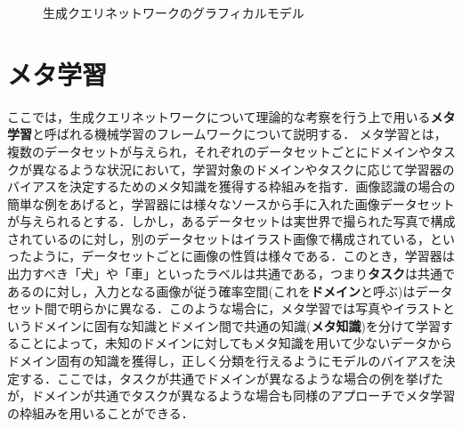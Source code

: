 \begin{figure}[tbp]
\begin{center}
\caption{生成クエリネットワークのグラフィカルモデル}
\label{fig:gm_gqn}
\end{center}
\end{figure}

\section{メタ学習}
\label{section:meta_learning}
ここでは，生成クエリネットワークについて理論的な考察を行う上で用いる{\bf メタ学習}と呼ばれる機械学習のフレームワークについて説明する．
メタ学習とは，複数のデータセットが与えられ，それぞれのデータセットごとにドメインやタスクが異なるような状況において，学習対象のドメインやタスクに応じて学習器のバイアスを決定するためのメタ知識を獲得する枠組みを指す\cite{Vilalta2002}．画像認識の場合の簡単な例をあげると，学習器には様々なソースから手に入れた画像データセットが与えられるとする．しかし，あるデータセットは実世界で撮られた写真で構成されているのに対し，別のデータセットはイラスト画像で構成されている，といったように，データセットごとに画像の性質は様々である．このとき，学習器は出力すべき「犬」や「車」といったラベルは共通である，つまり{\bf タスク}は共通であるのに対し，入力となる画像が従う確率空間(これを{\bf ドメイン}と呼ぶ)はデータセット間で明らかに異なる．このような場合に，メタ学習では写真やイラストというドメインに固有な知識とドメイン間で共通の知識({\bf メタ知識})を分けて学習することによって，未知のドメインに対してもメタ知識を用いて少ないデータからドメイン固有の知識を獲得し，正しく分類を行えるようにモデルのバイアスを決定する．ここでは，タスクが共通でドメインが異なるような場合の例を挙げたが，ドメインが共通でタスクが異なるような場合も同様のアプローチでメタ学習の枠組みを用いることができる．

